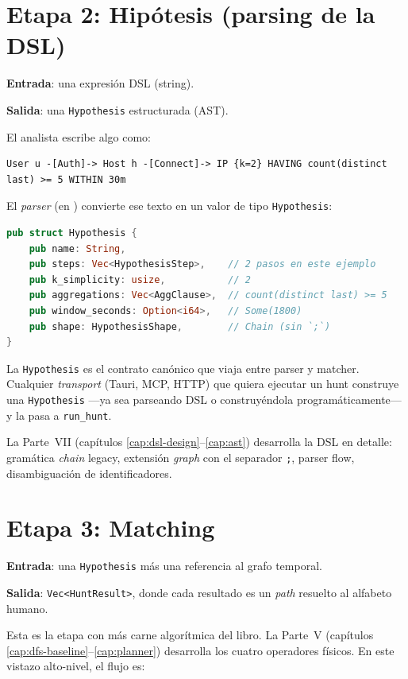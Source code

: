 \section{Etapa 2: Hipótesis (parsing de la DSL)}

\textbf{Entrada}: una expresión DSL (string).

\textbf{Salida}: una \texttt{Hypothesis} estructurada (AST).

El analista escribe algo como:

\begin{lstlisting}
User u -[Auth]-> Host h -[Connect]-> IP {k=2} HAVING count(distinct last) >= 5 WITHIN 30m
\end{lstlisting}

El \emph{parser} (en ) convierte ese texto en
un valor de tipo \texttt{Hypothesis}:

\begin{lstlisting}[language=Rust]
pub struct Hypothesis {
    pub name: String,
    pub steps: Vec<HypothesisStep>,    // 2 pasos en este ejemplo
    pub k_simplicity: usize,           // 2
    pub aggregations: Vec<AggClause>,  // count(distinct last) >= 5
    pub window_seconds: Option<i64>,   // Some(1800)
    pub shape: HypothesisShape,        // Chain (sin `;`)
}
\end{lstlisting}

\noindent
La \texttt{Hypothesis} es el contrato canónico que viaja entre
parser y matcher. Cualquier \emph{transport} (Tauri, MCP, HTTP) que
quiera ejecutar un hunt construye una \texttt{Hypothesis} ---ya sea
parseando DSL o construyéndola programáticamente--- y la pasa a
\texttt{run\_hunt}.

La Parte~VII (capítulos \ref{cap:dsl-design}--\ref{cap:ast})
desarrolla la DSL en detalle: gramática \emph{chain} legacy,
extensión \emph{graph} con el separador \texttt{;}, parser flow,
disambiguación de identificadores.

\section{Etapa 3: Matching}

\textbf{Entrada}: una \texttt{Hypothesis} más una referencia al
grafo temporal.

\textbf{Salida}: \texttt{Vec<HuntResult>}, donde cada resultado es
un \emph{path} resuelto al alfabeto humano.

Esta es la etapa con más carne algorítmica del libro. La Parte~V
(capítulos \ref{cap:dfs-baseline}--\ref{cap:planner}) desarrolla
los cuatro operadores físicos. En este vistazo alto-nivel, el flujo
es:

